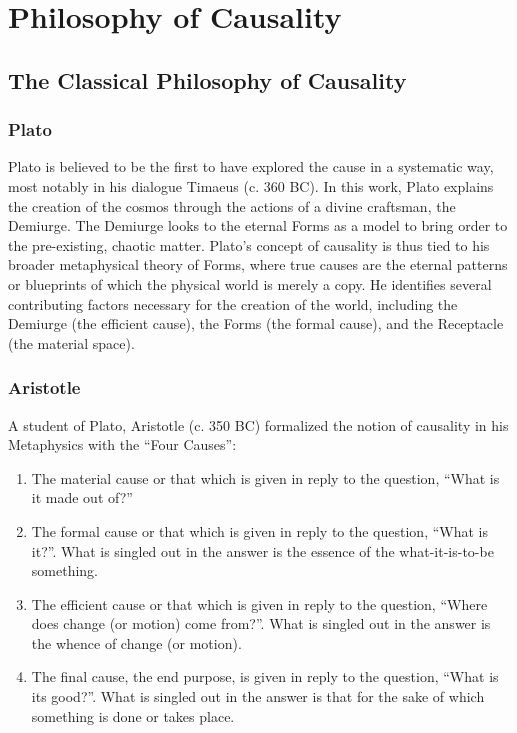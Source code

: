 \section{Philosophy of Causality}
\label{sec:philosophy}

\subsection{The Classical Philosophy of Causality}
\label{sec:philosophy_foundation}


\subsubsection{Plato}
\label{sec:history_plato}

Plato is believed to be the first to have explored the cause in a systematic way, most notably in his dialogue Timaeus\cite{archer1888timaeus} (c. 360 BC). In this work, Plato explains the creation of the cosmos through the actions of a divine craftsman, the Demiurge. The Demiurge looks to the eternal Forms as a model to bring order to the pre-existing, chaotic matter. Plato’s concept of causality is thus tied to his broader metaphysical theory of Forms, where true causes are the eternal patterns or blueprints of which the physical world is merely a copy. He identifies several contributing factors necessary for the creation of the world, including the Demiurge (the efficient cause), the Forms (the formal cause), and the Receptacle (the material space)\cite{archer1888timaeus}. 

\subsubsection{Aristotle}
\label{sec:history_aristotle}

A student of Plato, Aristotle (c. 350 BC) formalized the notion of causality in his Metaphysics\cite{heidegger1995aristotleMetaphysics} with the ``Four Causes''\cite{falcon2006aristotlecausality}:

\begin{enumerate}
    \item The material cause or that which is given in reply to the question, ``What is it made out of?''
    \item The formal cause or that which is given in reply to the question, ``What is it?''. What is singled out in the answer is the essence of the what-it-is-to-be something.
    \item The efficient cause or that which is given in reply to the question, ``Where does change (or motion) come from?''. What is singled out in the answer is the whence of change (or motion).
    \item The final cause, the end purpose, is given in reply to the question, ``What is its good?''. What is singled out in the answer is that for the sake of which something is done or takes place.
\end{enumerate}

